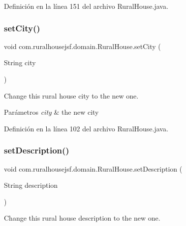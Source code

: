 Definición en la línea 151 del archivo Rural\+House.\+java.

\mbox{\label{classcom_1_1ruralhousejsf_1_1domain_1_1_rural_house_a329be3e41ca6f9e57a0fc887c066ad55}} 
\subsubsection{\texorpdfstring{setCity()}{setCity()}}
{\footnotesize\ttfamily void com.\+ruralhousejsf.\+domain.\+Rural\+House.\+set\+City (\begin{DoxyParamCaption}\item[{String}]{city }\end{DoxyParamCaption})}



Change this rural house city to the new one. 


\begin{DoxyParams}{Parámetros}
{\em city} & the new city \\
\hline
\end{DoxyParams}


Definición en la línea 102 del archivo Rural\+House.\+java.

\mbox{\label{classcom_1_1ruralhousejsf_1_1domain_1_1_rural_house_ad4e39275d6996833e089c2013bfb9c4b}} 
\subsubsection{\texorpdfstring{setDescription()}{setDescription()}}
{\footnotesize\ttfamily void com.\+ruralhousejsf.\+domain.\+Rural\+House.\+set\+Description (\begin{DoxyParamCaption}\item[{String}]{description }\end{DoxyParamCaption})}



Change this rural house description to the new one. 


